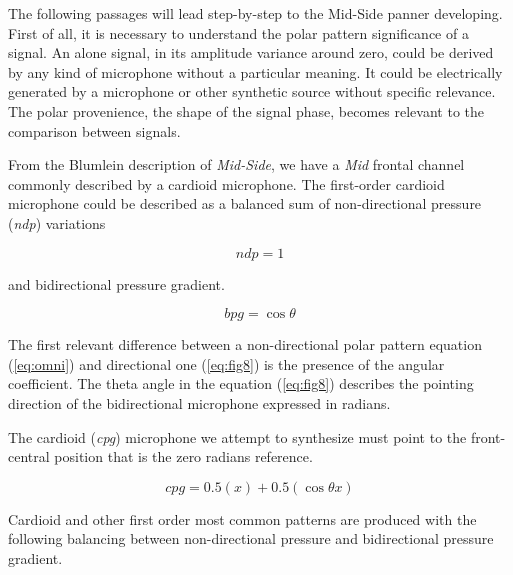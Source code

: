 \documentclass{article}
\begin{document}
The following passages will lead step-by-step to the Mid-Side panner developing. First of all, it is necessary to understand the polar pattern significance of a signal. An alone signal, in its amplitude variance around zero, could be derived by any kind of microphone without a particular meaning. It could be electrically generated by a microphone or other synthetic source without specific relevance. The polar provenience, the shape of the signal phase, becomes relevant to the comparison between signals.

From the Blumlein description of \emph{Mid-Side}, we have a \emph{Mid} frontal channel commonly described by a cardioid microphone. The first-order cardioid microphone could be described as a balanced sum of non-directional pressure (\emph{ndp}) variations

\begin{equation}
ndp = 1
\label{eq:omni}
\end{equation}

and bidirectional pressure gradient.

\begin{equation}
bpg = \cos\theta
\label{eq:fig8}
\end{equation}

The first relevant difference between a non-directional polar pattern equation (\ref{eq:omni}) and directional one (\ref{eq:fig8}) is the presence of the angular coefficient. The theta angle in the equation (\ref{eq:fig8}) describes the pointing direction of the bidirectional microphone expressed in radians.

The cardioid (\emph{cpg}) microphone we attempt to synthesize must point to the front-central position that is the zero radians reference.

\begin{equation}
cpg = 0.5(x) + 0.5(\cos\theta x)
\label{eq:cardioid}
\end{equation}

Cardioid and other first order most common patterns are produced with the following balancing between non-directional pressure and bidirectional pressure gradient.
\end{document}
